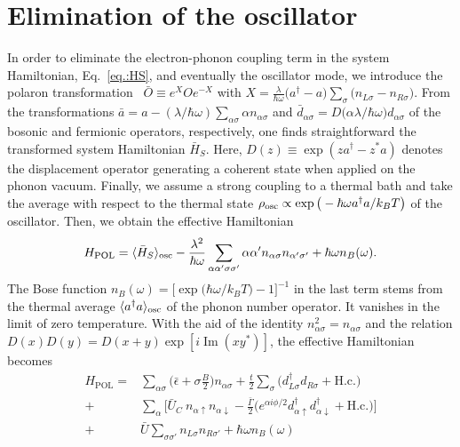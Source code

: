 \documentclass[aps,prb,twocolumn,superscriptaddress,amsmath,amssymb,longbibliography]{revtex4-1}
\newcommand{\ev}[1]{\ensuremath{\langle #1 \rangle}}
\newcommand{\up}{{\uparrow}}
\newcommand{\down}{{\downarrow}}
\renewcommand{\Im}{\ensuremath{\operatorname{Im}}}
\begin{document}
	
	\section{Elimination of the oscillator}
	In order to eliminate the electron-phonon coupling term in the system Hamiltonian, Eq.~\eqref{eq.:HS}, and eventually the oscillator mode,
	we introduce the polaron transformation~\cite{LangJETP1962a,BrandesPRL1999a,Mahan2000a,BrandesPR2005a} 
	$\bar O \equiv e^X O e^{-X}$ with $X=\frac{\lambda}{\hbar\omega}\big(a^\dag-a\big)\sum_{\sigma}\big(n_{L\sigma}-n_{R\sigma}\big)$. From the transformations $\bar a = a-(\lambda/\hbar\omega)\sum_{\alpha\sigma}\alpha n_{\alpha\sigma}$ 
	and  ${\bar d}_{\alpha\sigma}=D\big(\alpha\lambda/\hbar\omega\big) d_{\alpha\sigma}$ of
	the bosonic and fermionic operators, respectively, one finds straightforward the transformed system
	Hamiltonian ${\bar H}_S$. Here, $D(z)\equiv\exp(z a^\dag-z^* a)$ denotes the displacement operator generating
	a coherent state when applied on the phonon vacuum. Finally, we assume a strong coupling to a thermal bath and take the average with respect to the
	thermal state $\rho_{\rm osc}\propto\exp\big(-\hbar\omega a^\dag a/k_BT\big)$ of the oscillator. Then, we obtain the effective Hamiltonian
	\begin{equation}
		H_{\textrm{POL}}  = \ev{{\bar H}_S}_{\rm osc}
		-\frac{\lambda^2}{\hbar\omega}\sum_{\alpha\alpha'\sigma\sigma'}\alpha\alpha' n_{\alpha\sigma}n_{\alpha'\sigma'} + \hbar\omega n_B(\omega).
	\end{equation} 
	The Bose function $n_B(\omega)=\big[\exp\big(\hbar\omega/k_BT\big)-1\big]^{-1}$ in the last term stems from the
	thermal average  $\ev{a^\dag a}_{\rm osc}$ of the phonon number operator. It vanishes in the limit of zero temperature. With the aid of the 
	identity $n_{\alpha\sigma}^2=n_{\alpha\sigma}$  and the relation $D(x)D(y)=D(x+y)\exp[i\Im(x y^*)]$, the effective Hamiltonian becomes
	\begin{equation}
		\begin{split}
			H_{\textrm{POL}} {=}
			{ }& \sum_{\alpha\sigma}\Big(\bar\epsilon+\sigma\frac{B}{2} \Big)n_{\alpha\sigma} 
			+\frac{t}{2} \sum_{\sigma} \big(d^\dag_{L\sigma}d_{R\sigma} +\mathrm{H.c.}\big)\\
			+&\sum_{\alpha}\Big[
			{\bar U}_C\:\! n_{\alpha\up}n_{\alpha\down} - \frac{\bar\Gamma}{2} \big( 
			e^{\alpha i\phi/2} d^\dagger_{\alpha\up} d^\dagger_{\alpha\down}+\mathrm{H.c.}
			\big)\Big]\\
			+&\bar U\sum_{\sigma\sigma'}n_{L\sigma}n_{R\sigma'} 
			+ \hbar\omega  n_B(\omega)\label{eq.:HPol}
		\end{split}%
	\end{equation}%
\end{document}
